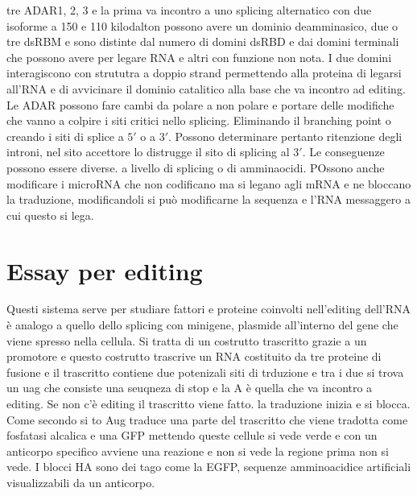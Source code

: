 tre ADAR1, 2, 3 e la prima va incontro a uno splicing alternatico con due isoforme a 150 e 110 kilodalton possono avere un dominio deamminasico, due o tre dsRBM e sono distinte dal 
numero di domini dsRBD e dai domini terminali che possono avere per legare RNA e altri con funzione non nota. I due domini interagiscono con strututra a doppio strand permettendo alla
proteina di legarsi all'RNA e di avvicinare il dominio catalitico alla base che va incontro ad editing. Le ADAR possono fare cambi da polare a non polare e portare delle modifiche
che vanno a colpire i siti critici nello splicing. Eliminando il branching point o creando i siti di splice a $5'$ o a $3'$. Possono determinare pertanto ritenzione degli introni, nel
sito accettore lo distrugge il sito di splicing al $3'$. Le conseguenze possono essere diverse. a livello di splicing o di amminaocidi. POssono anche modificare i microRNA che non 
codificano ma si legano agli mRNA e ne bloccano la traduzione, modificandoli si pu\`o modificarne la sequenza e l'RNA messaggero a cui questo si lega.
\section{Essay per editing}
Questi sistema serve per studiare fattori e proteine coinvolti nell'editing dell'RNA \`e analogo a quello dello splicing con minigene, plasmide all'interno del gene che viene spresso
nella cellula. Si tratta di un costrutto trascritto grazie a un promotore e questo costrutto trascrive un RNA costituito da tre proteine di fusione e il trascritto contiene due
potenizali siti di trduzione e tra i due si trova un uag che consiste una seuqneza di stop e la A \`e quella che va incontro a editing. Se non c'\`e editing il trascritto viene 
fatto. la traduzione inizia e si blocca. Come secondo si to Aug traduce una parte del trascritto che viene tradotta come fosfatasi alcalica e una GFP mettendo queste cellule si 
vede verde e con un anticorpo specifico avviene una reazione e non si vede la regione prima non si vede. I blocci HA sono dei tago come la EGFP, sequenze amminoacidice artificiali 
visualizzabili da un anticorpo. 
